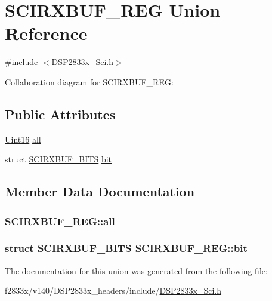 \hypertarget{union_s_c_i_r_x_b_u_f___r_e_g}{}\section{S\+C\+I\+R\+X\+B\+U\+F\+\_\+\+R\+E\+G Union Reference}
\label{union_s_c_i_r_x_b_u_f___r_e_g}


{\ttfamily \#include $<$D\+S\+P2833x\+\_\+\+Sci.\+h$>$}



Collaboration diagram for S\+C\+I\+R\+X\+B\+U\+F\+\_\+\+R\+E\+G\+:
\subsection*{Public Attributes}
\begin{DoxyCompactItemize}
\item 
\hyperlink{_d_s_p2833x___device_8h_a59a9f6be4562c327cbfb4f7e8e18f08b}{Uint16} \hyperlink{union_s_c_i_r_x_b_u_f___r_e_g_a826b7f9937aa686977fc1196a6ea12a1}{all}
\item 
struct \hyperlink{struct_s_c_i_r_x_b_u_f___b_i_t_s}{S\+C\+I\+R\+X\+B\+U\+F\+\_\+\+B\+I\+T\+S} \hyperlink{union_s_c_i_r_x_b_u_f___r_e_g_ac138f9553b89709d5c3357d91cb76fa7}{bit}
\end{DoxyCompactItemize}


\subsection{Member Data Documentation}
\hypertarget{union_s_c_i_r_x_b_u_f___r_e_g_a826b7f9937aa686977fc1196a6ea12a1}{}
\subsubsection[{all}]{ S\+C\+I\+R\+X\+B\+U\+F\+\_\+\+R\+E\+G\+::all}\label{union_s_c_i_r_x_b_u_f___r_e_g_a826b7f9937aa686977fc1196a6ea12a1}
\hypertarget{union_s_c_i_r_x_b_u_f___r_e_g_ac138f9553b89709d5c3357d91cb76fa7}{}
\subsubsection[{bit}]{\setlength{\rightskip}{0pt plus 5cm}struct {\bf S\+C\+I\+R\+X\+B\+U\+F\+\_\+\+B\+I\+T\+S} S\+C\+I\+R\+X\+B\+U\+F\+\_\+\+R\+E\+G\+::bit}\label{union_s_c_i_r_x_b_u_f___r_e_g_ac138f9553b89709d5c3357d91cb76fa7}


The documentation for this union was generated from the following file\+:\begin{DoxyCompactItemize}
\item 
f2833x/v140/\+D\+S\+P2833x\+\_\+headers/include/\hyperlink{_d_s_p2833x___sci_8h}{D\+S\+P2833x\+\_\+\+Sci.\+h}\end{DoxyCompactItemize}
